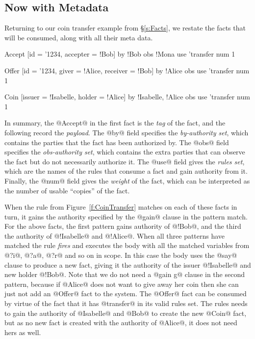 \subsection{Now with Metadata}

Returning to our coin transfer example from \S\ref{s:Facts}, we restate the facts that will be consumed, along with all their meta data.

\begin{small}
\begin{code}
 Accept [id = '1234, accepter = !Bob]
    by  {!Bob}                obs {!Mona}
    use {'transfer}           num 1

 Offer  [id = '1234, giver = !Alice, receiver = !Bob]
    by  {!Alice}              obs {}
    use {'transfer}           num 1

 Coin   [issuer = !Isabelle, holder  = !Alice]
    by  {!Isabelle, !Alice}   obs {}
    use {'transfer}           num 1
\end{code}
\end{small}

In summary, the @Accept@ in the first fact is the \emph{tag} of the fact, and the following record the \emph{payload}. The @by@ field specifies the \emph{by-authority set}, which contains the parties that the fact has been authorized by. The @obs@ field specifies the \emph{obs-authority set}, which contains the extra parties that can observe the fact but do not necessarily authorize it. The @use@ field gives the \emph{rules set}, which are the names of the rules that consume a fact and gain authority from it. Finally, the @num@ field gives the \emph{weight} of the fact, which can be interpreted as the number of usable ``copies'' of the fact.

When the rule from Figure~\ref{f:CoinTransfer} matches on each of these facts in turn, it gains the authority specified by the @gain@ clause in the pattern match. For the above facts, the first pattern gains authority of @!Bob@, and the third the authority of @!Isabelle@ and @!Alice@. When all three patterns have matched the rule \emph{fires} and executes the body with all the matched variables from @?i@, @?a@, @?r@ and so on in scope. In this case the body uses the @say@ clause to produce a new fact, giving it the authority of the issuer @!Isabelle@ and new holder @!Bob@. Note that we do not need a @gain g@ clause in the second pattern, because if @Alice@ does not want to give away her coin then she can just not add an @Offer@ fact to the system. The @Offer@ fact can be consumed by virtue of the fact that it has @transfer@ in its valid rules set. The rules needs to gain the authority of @Isabelle@ and @Bob@ to create the new @Coin@ fact, but as no new fact is created with the authority of @Alice@, it does not need hers as well.

